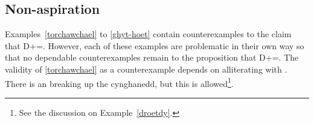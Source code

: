 \subsection{Non-aspiration}
\label{sec:non-aspiration}
Examples~\ref{torchawchael} to \ref{ghyt-hoet} contain counterexamples to the claim that \gls{D}+=\xT. However, each of these examples are problematic in their own way so that  no dependable counterexamples remain to the proposition that \gls{D}+=\xT.
The validity of \ref{torchawchael} as a counterexample depends on  alliterating with . There is an  breaking up the cynghanedd, but this is allowed\footnote{See the discussion on Example~\ref{droetdy}.}. 
